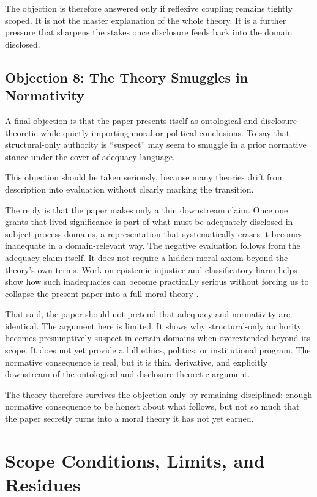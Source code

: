 \documentclass[11pt]{article}
\begin{document}
The objection is therefore answered only if reflexive coupling remains tightly scoped. It is not the master explanation of the whole theory. It is a further pressure that sharpens the stakes once disclosure feeds back into the domain disclosed.

\subsection{Objection 8: The Theory Smuggles in Normativity}

A final objection is that the paper presents itself as ontological and disclosure-theoretic while quietly importing moral or political conclusions. To say that structural-only authority is ``suspect'' may seem to smuggle in a prior normative stance under the cover of adequacy language.

This objection should be taken seriously, because many theories drift from description into evaluation without clearly marking the transition.

The reply is that the paper makes only a thin downstream claim. Once one grants that lived significance is part of what must be adequately disclosed in subject-process domains, a representation that systematically erases it becomes inadequate in a domain-relevant way. The negative evaluation follows from the adequacy claim itself. It does not require a hidden moral axiom beyond the theory's own terms. Work on epistemic injustice and classificatory harm helps show how such inadequacies can become practically serious without forcing us to collapse the present paper into a full moral theory \cite{Fricker2007,BowkerStar1999}.

That said, the paper should not pretend that adequacy and normativity are identical. The argument here is limited. It shows why structural-only authority becomes presumptively suspect in certain domains when overextended beyond its scope. It does not yet provide a full ethics, politics, or institutional program. The normative consequence is real, but it is thin, derivative, and explicitly downstream of the ontological and disclosure-theoretic argument.

The theory therefore survives the objection only by remaining disciplined: enough normative consequence to be honest about what follows, but not so much that the paper secretly turns into a moral theory it has not yet earned.
\section{Scope Conditions, Limits, and Residues}
\end{document}

